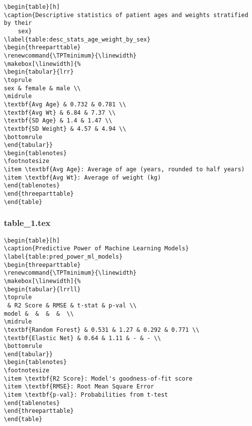 \documentclass[11pt]{article}
\begin{document}
\begin{Verbatim}[tabsize=4]
\begin{table}[h]
\caption{Descriptive statistics of patient ages and weights stratified by their
	sex}
\label{table:desc_stats_age_weight_by_sex}
\begin{threeparttable}
\renewcommand{\TPTminimum}{\linewidth}
\makebox[\linewidth]{%
\begin{tabular}{lrr}
\toprule
sex & female & male \\
\midrule
\textbf{Avg Age} & 0.732 & 0.781 \\
\textbf{Avg Wt} & 6.84 & 7.37 \\
\textbf{SD Age} & 1.4 & 1.47 \\
\textbf{SD Weight} & 4.57 & 4.94 \\
\bottomrule
\end{tabular}}
\begin{tablenotes}
\footnotesize
\item \textbf{Avg Age}: Average of age (years, rounded to half years)
\item \textbf{Avg Wt}: Average of weight (kg)
\end{tablenotes}
\end{threeparttable}
\end{table}

\end{Verbatim}

\subsubsection*{table\_1.tex}

\begin{Verbatim}[tabsize=4]
\begin{table}[h]
\caption{Predictive Power of Machine Learning Models}
\label{table:pred_power_ml_models}
\begin{threeparttable}
\renewcommand{\TPTminimum}{\linewidth}
\makebox[\linewidth]{%
\begin{tabular}{lrrll}
\toprule
 & R2 Score & RMSE & t-stat & p-val \\
model &  &  &  &  \\
\midrule
\textbf{Random Forest} & 0.531 & 1.27 & 0.292 & 0.771 \\
\textbf{Elastic Net} & 0.64 & 1.11 & - & - \\
\bottomrule
\end{tabular}}
\begin{tablenotes}
\footnotesize
\item \textbf{R2 Score}: Model's goodness-of-fit score
\item \textbf{RMSE}: Root Mean Square Error
\item \textbf{p-val}: Probabilities from t-test
\end{tablenotes}
\end{threeparttable}
\end{table}

\end{Verbatim}
\end{document}
